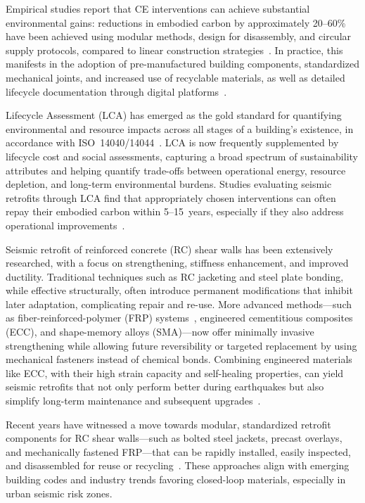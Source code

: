 \documentclass[fleqn,10pt]{wlscirep}
\begin{document}
Empirical studies report that CE interventions can achieve substantial environmental
gains: reductions in embodied carbon by approximately 20--60\% have been achieved using
modular methods, design for disassembly, and circular supply protocols, compared to
linear construction strategies~\cite{zhang2024,rmi2021}. In practice, this manifests in
the adoption of pre-manufactured building components, standardized mechanical joints,
and increased use of recyclable materials, as well as detailed lifecycle documentation
through digital platforms~\cite{ec_levels,globalabc_dfd_2025}.

Lifecycle Assessment (LCA) has emerged as the gold standard for quantifying
environmental and resource impacts across all stages of a building's existence, in
accordance with ISO~14040/14044~\cite{iso14040_14044}. LCA is now frequently
supplemented by lifecycle cost and social assessments, capturing a broad spectrum of
sustainability attributes and helping quantify trade-offs between operational energy,
resource depletion, and long-term environmental burdens. Studies evaluating seismic
retrofits through LCA find that appropriately chosen interventions can often repay their
embodied carbon within 5--15~years, especially if they also address operational
improvements~\cite{Salgado2020,Passoni2024}.

Seismic retrofit of reinforced concrete (RC) shear walls has been extensively researched,
with a focus on strengthening, stiffness enhancement, and improved ductility.
Traditional techniques such as RC jacketing and steel plate bonding, while effective
structurally, often introduce permanent modifications that inhibit later adaptation,
complicating repair and re-use. More advanced methods---such as
fiber-reinforced-polymer (FRP) systems~\cite{mccoy2019,yu2024}, engineered cementitious
composites (ECC), and shape-memory alloys (SMA)---now offer minimally invasive
strengthening while allowing future reversibility or targeted replacement by using
mechanical fasteners instead of chemical bonds. Combining engineered materials like ECC,
with their high strain capacity and self-healing properties, can yield seismic retrofits
that not only perform better during earthquakes but also simplify long-term maintenance
and subsequent upgrades~\cite{shang2019_ecc_rc_strengthening, keskin2016_ecc_self_healing}.

Recent years have witnessed a move towards modular, standardized retrofit components for
RC shear walls---such as bolted steel jackets, precast overlays, and mechanically
fastened FRP---that can be rapidly installed, easily inspected, and disassembled for
reuse or recycling~\cite{peikko2022,kuepfer2023,mccoy2019}. These approaches align with
emerging building codes and industry trends favoring closed-loop materials, especially in
urban seismic risk zones.
\end{document}
